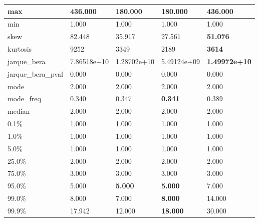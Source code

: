 \begin{table}[H]
\begin{tabular}{|l|m{10em}|m{10em}|m{10em}|m{10em}|}
\hline max & 436.000 & \cellcolor[rgb]{0.9, 0.54, 0.52} 180.000 & \cellcolor[rgb]{0.9, 0.54, 0.52} 180.000 & \bfseries 436.000 \\
\hline min & 1.000 & 1.000 & 1.000 & 1.000 \\
\hline skew & 82.448 & 35.917 & \cellcolor[rgb]{0.9, 0.54, 0.52} 27.561 & \bfseries 51.076 \\
\hline kurtosis & 9252 & 3349 & \cellcolor[rgb]{0.9, 0.54, 0.52} 2189 & \bfseries 3614 \\
\hline jarque\_bera & 7.86518e+10 & 1.28702e+10 & \cellcolor[rgb]{0.9, 0.54, 0.52} 5.49124e+09 & \bfseries 1.49972e+10 \\
\hline jarque\_bera\_pval & 0.000 & 0.000 & 0.000 & 0.000 \\
\hline mode & 2.000 & 2.000 & 2.000 & 2.000 \\
\hline mode\_freq & 0.340 & 0.347 & \bfseries 0.341 & \cellcolor[rgb]{0.9, 0.54, 0.52} 0.389 \\
\hline median & 2.000 & 2.000 & 2.000 & 2.000 \\
\hline 0.1\% & 1.000 & 1.000 & 1.000 & 1.000 \\
\hline 1.0\% & 1.000 & 1.000 & 1.000 & 1.000 \\
\hline 5.0\% & 1.000 & 1.000 & 1.000 & 1.000 \\
\hline 25.0\% & 2.000 & 2.000 & 2.000 & 2.000 \\
\hline 75.0\% & 3.000 & 3.000 & 3.000 & 3.000 \\
\hline 95.0\% & 5.000 & \bfseries 5.000 & \bfseries 5.000 & \cellcolor[rgb]{0.9, 0.54, 0.52} 7.000 \\
\hline 99.0\% & 8.000 & 7.000 & \bfseries 8.000 & \cellcolor[rgb]{0.9, 0.54, 0.52} 14.000 \\
\hline 99.9\% & 17.942 & 12.000 & \bfseries 18.000 & \cellcolor[rgb]{0.9, 0.54, 0.52} 30.000 \\
\hline
\end{tabular}
\end{table}
